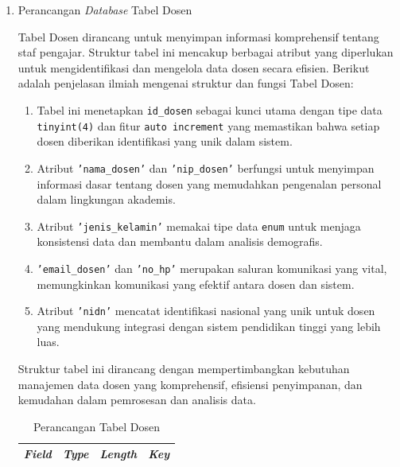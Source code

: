 \begin{enumerate}

	\item Perancangan \textit{Database} Tabel Dosen

	      Tabel Dosen dirancang untuk menyimpan informasi komprehensif tentang staf pengajar. Struktur tabel ini mencakup berbagai atribut yang diperlukan untuk mengidentifikasi dan mengelola data dosen secara efisien. Berikut adalah penjelasan ilmiah mengenai struktur dan fungsi Tabel Dosen:

	      \begin{enumerate}[label=\alph*.]
		      \item Tabel ini menetapkan \texttt{id\_dosen} sebagai kunci utama dengan tipe data \texttt{tinyint(4)} dan fitur \texttt{auto increment} yang memastikan bahwa setiap dosen diberikan identifikasi yang unik dalam sistem.
		      \item Atribut \texttt{'nama\_dosen'} dan \texttt{'nip\_dosen'} berfungsi untuk menyimpan informasi dasar tentang dosen yang memudahkan pengenalan personal dalam lingkungan akademis.
		      \item Atribut \texttt{'jenis\_kelamin'} memakai tipe data \texttt{enum} untuk menjaga konsistensi data dan membantu dalam analisis demografis.
		      \item \texttt{'email\_dosen'} dan \texttt{'no\_hp'} merupakan saluran komunikasi yang vital, memungkinkan komunikasi yang efektif antara dosen dan sistem.
		      \item Atribut \texttt{'nidn'} mencatat identifikasi nasional yang unik untuk dosen yang mendukung integrasi dengan sistem pendidikan tinggi yang lebih luas.
	      \end{enumerate}

	      Struktur tabel ini dirancang dengan mempertimbangkan kebutuhan manajemen data dosen yang komprehensif, efisiensi penyimpanan, dan kemudahan dalam pemrosesan dan analisis data.

		      {
			      \fontsize{10}{13}\selectfont
			      \begin{longtable}{p{3 cm} p{3cm} p{3 cm} p{3.4 cm}}
				      \caption{Perancangan Tabel Dosen}
				      \label{admin}                                                                                                                 \\
				      \hline
				      \textbf{\textit{Field}} & \textbf{\textit{Type}} & \textbf{\textit{Length}}            & \textbf{\textit{Key}}                \\
				      \hline
				      \endfirsthead


\end{longtable}}
\end{enumerate}

